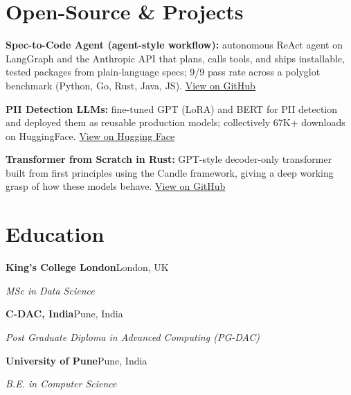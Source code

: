 \documentclass[10pt,a4paper]{article}
\begin{document}
\section{Open-Source \& Projects}
\begin{tight}
  \item \textbf{Spec-to-Code Agent (agent-style workflow):} autonomous ReAct agent on LangGraph and the Anthropic API that plans, calls tools, and ships installable, tested packages from plain-language specs; 9/9 pass rate across a polyglot benchmark (Python, Go, Rust, Java, JS). \href{https://github.com/abhijeetscode/Spec-to-Code-Agent}{View on GitHub}
  \item \textbf{PII Detection LLMs:} fine-tuned GPT (LoRA) and BERT for PII detection and deployed them as reusable production models; collectively 67K+ downloads on HuggingFace. \href{https://huggingface.co/ab-ai/pii_model}{View on Hugging Face}
  \item \textbf{Transformer from Scratch in Rust:} GPT-style decoder-only transformer built from first principles using the Candle framework, giving a deep working grasp of how these models behave. \href{https://github.com/abhijeetscode/transformer-rust}{View on GitHub}
\end{tight}

\section{Education}
{\color{company}\bfseries King's College London}\hfill {\color{muted}London, UK}\par
{\itshape MSc in Data Science}\par\vspace{2pt}
{\color{company}\bfseries C-DAC, India}\hfill {\color{muted}Pune, India}\par
{\itshape Post Graduate Diploma in Advanced Computing (PG-DAC)}\par\vspace{2pt}
{\color{company}\bfseries University of Pune}\hfill {\color{muted}Pune, India}\par
{\itshape B.E. in Computer Science}\par
\end{document}
